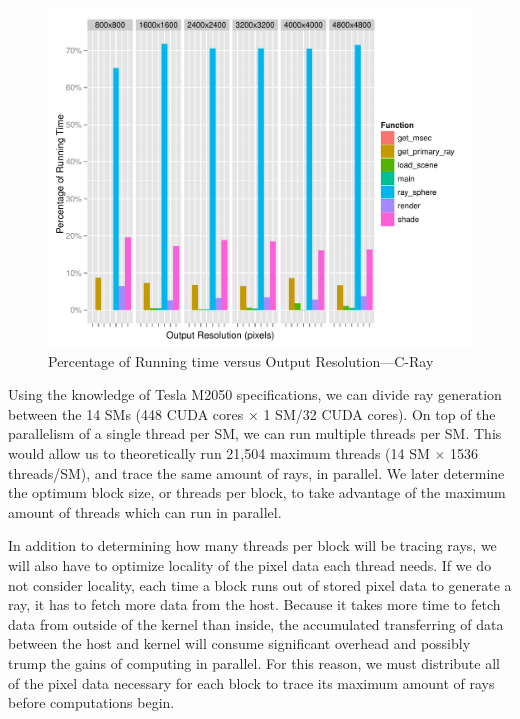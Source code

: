 \documentclass[12pt]{article}
\begin{document}
\begin{figure}
    \caption{Percentage of Running time versus Output Resolution---C-Ray} \label{fig:gprof}
    \begin{center}
\includegraphics{cudatrace-002}
    \end{center}
\end{figure}


Using the knowledge of Tesla M2050 specifications, we can divide ray generation between the 14 SMs (448 CUDA cores $\times$ 1 SM/32 CUDA cores). On top of the parallelism of a single thread per SM, we can run multiple threads per SM. This would allow us to theoretically run 21,504 maximum threads (14 SM $\times$ 1536 threads/SM), and trace the same amount of rays, in parallel. We later determine the optimum block size, or threads per block, to take advantage of the maximum amount of threads which can run in parallel.

In addition to determining how many threads per block will be tracing rays, we will also have to optimize locality of the pixel data each thread needs. If we do not consider locality, each time a block runs out of stored pixel data to generate a ray, it has to fetch more data from the host. Because it takes more time to fetch data from outside of the kernel than inside, the accumulated transferring of data between the host and kernel will consume significant overhead and possibly trump the gains of computing in parallel. For this reason, we must distribute all of the pixel data necessary for each block to trace its maximum amount of rays before computations begin.
\end{document}
